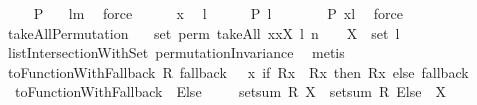 \begin{isabellebody}
\ \ \ \isamarkupfalse%
\ {\isachardoublequoteopen}{\isacharquery}P\ {\isacharbrackleft}{\isacharbrackright}{\isachardoublequoteclose}\ \isamarkupfalse%
\ lm{}{}{}\ \isamarkupfalse%
\ force\ \isanewline
\ \ \ \isamarkupfalse%
\ x\ \isamarkupfalse%
\ l\ \isanewline
\ \ \ \isamarkupfalse%
\ {\isachardoublequoteopen}{\isacharquery}P\ l{\isachardoublequoteclose}\ \isamarkupfalse%
\ \isanewline
\ \ \ \isamarkupfalse%
\ {\isachardoublequoteopen}{\isacharquery}P\ {\isacharparenleft}x{\isacharhash}l{\isacharparenright}{\isachardoublequoteclose}\ \isamarkupfalse%
\ force\isanewline
{}\isamarkupfalse%
%
\endisatagproof
{\isafoldproof}%
%
\isadelimproof
\isanewline
%
\endisadelimproof
\isanewline
\isanewline
{}\isamarkupfalse%
\ takeAllPermutation{\isacharcolon}\ \isanewline
\ \ {\isachardoublequoteopen}set\ {\isacharparenleft}perm{}\ {\isacharparenleft}takeAll\ {\isacharparenleft}{\isacharpercent}x{\isachardot}{\isacharparenleft}x{\isasymin}X{\isacharparenright}{\isacharparenright}\ l{\isacharparenright}\ n{\isacharparenright}\ \ {\isasymsubseteq}\ \ X\ {\isasyminter}\ set\ l{\isachardoublequoteclose}\ \isanewline
%
\isadelimproof
\ \ %
\endisadelimproof
%
\isatagproof
{}\isamarkupfalse%
\ listIntersectionWithSet\ permutationInvariance\ \isamarkupfalse%
\ metis%
\endisatagproof
{\isafoldproof}%
%
\isadelimproof
%
\endisadelimproof
%
\isamarkuptrue%
\isamarkupfalse%
\ {\isachardoublequoteopen}toFunctionWithFallback\ R\ fallback\ {\isacharequal}{\isacharequal}\ {\isacharparenleft}{\isacharpercent}\ x{\isachardot}\ if\ {\isacharparenleft}R{\isacharbackquote}{\isacharbackquote}{\isacharbraceleft}x{\isacharbraceright}\ {\isacharequal}\ {\isacharbraceleft}R{\isacharcomma}{\isacharcomma}x{\isacharbraceright}{\isacharparenright}\ then\ {\isacharparenleft}R{\isacharcomma}{\isacharcomma}x{\isacharparenright}\ else\ fallback{\isacharparenright}{\isachardoublequoteclose}\isanewline
{}\isamarkupfalse%
\ \isanewline
\ \ toFunctionWithFallback\ {\isacharparenleft}\ {\isachardoublequoteopen}Else{\isachardoublequoteclose}\ {}{}{\isacharparenright}\isanewline
\isanewline
{}\isamarkupfalse%
\ \isanewline
\ \ {\isachardoublequoteopen}setsum{\isacharprime}\ R\ X\ {\isacharequal}{\isacharequal}\ setsum\ {\isacharparenleft}R\ Else\ {}{\isacharparenright}\ X{\isachardoublequoteclose}\isanewline

\end{isabellebody}
